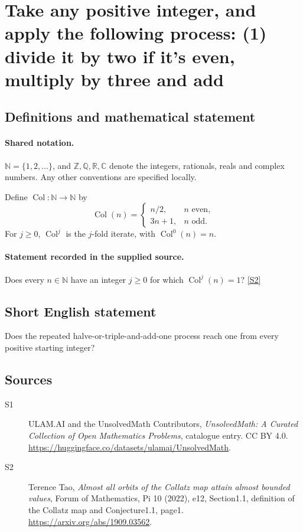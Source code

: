 \documentclass[11pt]{article}
\newcommand{\sref}[2]{\hyperlink{source:#1:#2}{[S#2]}}
\begin{document}
\section{Take any positive integer, and apply the following process: (1) divide it by two if it's even, multiply by three and add}\label{statement}

\subsection{Definitions and mathematical statement}

\paragraph{Shared notation.}$\mathbb N=\{1,2,\ldots\}$, and $\mathbb Z,\mathbb Q,\mathbb R,\mathbb C$ denote the integers, rationals, reals and complex numbers. Any other conventions are specified locally.


Define $\operatorname{Col}:\mathbb N\to\mathbb N$ by
\[\operatorname{Col}(n)=\begin{cases}n/2,&n\text{ even},\\3n+1,&n\text{ odd}.\end{cases}\]
For $j\ge0$, $\operatorname{Col}^j$ is the $j$-fold iterate, with $\operatorname{Col}^0(n)=n$.

\paragraph{Statement recorded in the supplied source.}
Does every $n\in\mathbb N$ have an integer $j\ge0$ for which $\operatorname{Col}^j(n)=1$? \sref{statement}{2}

\subsection{Short English statement}
Does the repeated halve-or-triple-and-add-one process reach one from every positive starting integer?
\subsection{Sources}
\begin{description}
\item[\hypertarget{source:statement:1}{S1}] ULAM.AI and the UnsolvedMath Contributors, \emph{UnsolvedMath: A Curated Collection of Open Mathematics Problems}, catalogue entry. CC BY 4.0. \url{https://huggingface.co/datasets/ulamai/UnsolvedMath}.
\item[\hypertarget{source:statement:2}{S2}] Terence Tao, \emph{Almost all orbits of the Collatz map attain almost bounded values}, Forum of Mathematics, Pi 10 (2022), e12, Section1.1, definition of the Collatz map and Conjecture1.1, page1. \url{https://arxiv.org/abs/1909.03562}.
\end{description}
\label{end:statement}
\end{document}
